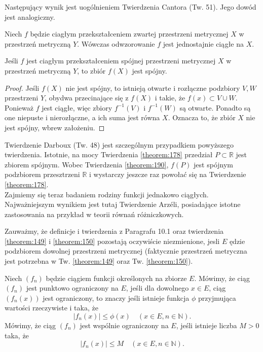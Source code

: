 \documentclass[leqno]{article}
\begin{document}
\begin{justify}
Następujący wynik jest uogólnieniem Twierdzenia Cantora  (Tw. 51). Jego dowód jest analogiczny.

\begin{theorem}
{
    Niech $f$ będzie ciagłym przekształceniem zwartej przestrzeni metrycznej $X$ w przestrzeń metryczną $Y$.
    Wówczas odwzorowanie $f$ jest jednostajnie ciągłe na $X$.
}
\end{theorem}

\begin{theorem}
{
    Jeśli $f$ jest ciagłym przekształceniem spójnej przestrzeni metrycznej $X$ w przestrzeń metryczną $Y$, to zbiór $f(X)$ jest spójny.
}
\end{theorem}

\begin{proof}
    Jeśli $f(X)$ nie jest spójny, to istnieją otwarte i rozłączne podzbiory $V, W$ przestrzeni $Y$, obydwa przecinające się z $f(X)$ i takie, że $f(x) \subset V \cup W$.
    Ponieważ $f$ jest ciągłe, więc zbiory $f^{-1}(V)$ i $f^{-1}(W)$ są otwarte.
    Ponadto są one niepuste i nierozłączne, a ich suma jest równa $X$. Oznacza to, że zbiór $X$ nie jest spójny, wbrew założeniu.
\end{proof}

Twierdzenie Darboux (Tw. 48) jest szczególnym przypadkiem powyższego twierdzenia. Istotnie, na mocy Twierdzenia \ref{theorem:178} przedział
$P \subset \mathbb{R}$ jest zbiorem spójnym. Wobec Twierdzenia \ref{theorem:190}, $f(P)$ jest spójnym podzbiorem przesztrzeni $\mathbb{R}$ i wystarczy jeszcze raz powołać się na Twierdzenie \ref{theorem:178}. \\
Zajmiemy się teraz badaniem rodziny funkcji jednakowo ciągłych. Najważniejszym wynikiem jest tutaj Twierdzenie Arzéli,
posiadające istotne zastosowania na przykład w teorii równań różniczkowych.

\begin{uwaga}
    Zauważmy, że definicje i twierdzenia z Paragrafu 10.1 oraz twierdzenia \ref{theorem:149} i \ref{theorem:150}
    pozostają oczywiście niezmienione, jesli $E$ ędzie podzbiorem dowolnej przestrzeni metrycznej (faktycznie przestrzeń metryczna jest potrzebna w Tw. \ref{theorem:149} oraz Tw. \ref{theorem:150}).
\end{uwaga}

\begin{defn}
    Niech $(f_n)$ będzie ciągiem funkcji określonych na zbiorze $E$. Mówimy, że ciąg $(f_n)$ jest punktowo ograniczony na $E$, jeśli dla dowolnego $x \in E$, ciąg $(f_n(x))$ jest 
    ograniczony, to znaczy jeśli istnieje funkcja $\phi$ przyjmująca wartości rzeczywiste i taka, że 
    \[
        |f_n(x)| \leqslant \phi(x) \quad (x \in E, n \in \mathbb{N}).
    \]
    Mówimy, że ciąg $(f_n)$ jest wspólnie ograniczony na $E$, jeśli istnieje liczba $M > 0$ taka, że
    \[
        |f_n(x)| \leqslant M \quad (x \in E, n \in \mathbb{N}).
    \]
\end{defn}


\end{justify}
\end{document}
